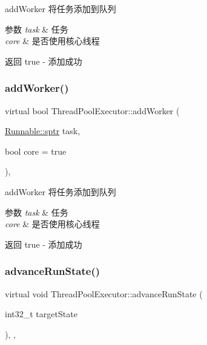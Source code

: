 add\+Worker 将任务添加到队列 


\begin{DoxyParams}{参数}
{\em task} & 任务 \\
\hline
{\em core} & 是否使用核心线程\\
\hline
\end{DoxyParams}
\begin{DoxyReturn}{返回}
true -\/ 添加成功 
\end{DoxyReturn}
\mbox{\label{classThreadPoolExecutor_a9f108a305159ddf47923162f89a91a64}} 
\subsubsection{\texorpdfstring{add\+Worker()}{addWorker()}\hspace{0.1cm}{\footnotesize\ttfamily [2/2]}}
{\footnotesize\ttfamily virtual bool Thread\+Pool\+Executor\+::add\+Worker (\begin{DoxyParamCaption}\item[{\hyperlink{classRunnable_abe8d3066c7305401d6f0aad8e70780f2}{Runnable\+::sptr}}]{task,  }\item[{bool}]{core = {\ttfamily true} }\end{DoxyParamCaption})\hspace{0.3cm}{\ttfamily [protected]}, {\ttfamily [virtual]}}



add\+Worker 将任务添加到队列 


\begin{DoxyParams}{参数}
{\em task} & 任务 \\
\hline
{\em core} & 是否使用核心线程\\
\hline
\end{DoxyParams}
\begin{DoxyReturn}{返回}
true -\/ 添加成功 
\end{DoxyReturn}
\mbox{\label{classThreadPoolExecutor_abaa3926310766a93b7fe1d83b77efdae}} 
\subsubsection{\texorpdfstring{advance\+Run\+State()}{advanceRunState()}}
{\footnotesize\ttfamily virtual void Thread\+Pool\+Executor\+::advance\+Run\+State (\begin{DoxyParamCaption}\item[{int32\+\_\+t}]{target\+State }\end{DoxyParamCaption})\hspace{0.3cm}{\ttfamily [final]}, {\ttfamily [protected]}, {\ttfamily [virtual]}}



